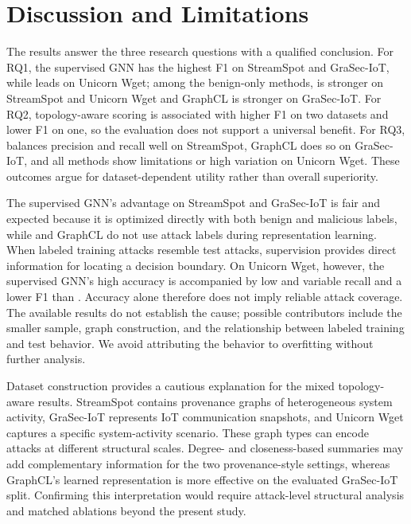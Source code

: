 \section{Discussion and Limitations}\label{sec:discussion}

The results answer the three research questions with a qualified conclusion. For RQ1, the supervised GNN has the highest F1 on StreamSpot and GraSec-IoT, while \sysname{} leads on Unicorn Wget; among the benign-only methods, \sysname{} is stronger on StreamSpot and Unicorn Wget and GraphCL is stronger on GraSec-IoT. For RQ2, topology-aware scoring is associated with higher F1 on two datasets and lower F1 on one, so the evaluation does not support a universal benefit. For RQ3, \sysname{} balances precision and recall well on StreamSpot, GraphCL does so on GraSec-IoT, and all methods show limitations or high variation on Unicorn Wget. These outcomes argue for dataset-dependent utility rather than overall superiority.

The supervised GNN's advantage on StreamSpot and GraSec-IoT is fair and expected because it is optimized directly with both benign and malicious labels, while \sysname{} and GraphCL do not use attack labels during representation learning. When labeled training attacks resemble test attacks, supervision provides direct information for locating a decision boundary. On Unicorn Wget, however, the supervised GNN's high accuracy is accompanied by low and variable recall and a lower F1 than \sysname{}. Accuracy alone therefore does not imply reliable attack coverage. The available results do not establish the cause; possible contributors include the smaller sample, graph construction, and the relationship between labeled training and test behavior. We avoid attributing the behavior to overfitting without further analysis.

Dataset construction provides a cautious explanation for the mixed topology-aware results. StreamSpot contains provenance graphs of heterogeneous system activity, GraSec-IoT represents IoT communication snapshots, and Unicorn Wget captures a specific system-activity scenario. These graph types can encode attacks at different structural scales. Degree- and closeness-based summaries may add complementary information for the two provenance-style settings, whereas GraphCL's learned representation is more effective on the evaluated GraSec-IoT split. Confirming this interpretation would require attack-level structural analysis and matched ablations beyond the present study.


